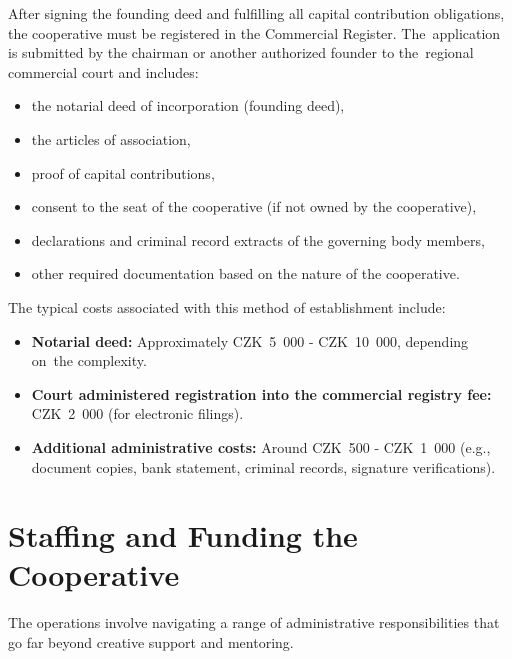 After signing the founding deed and fulfilling all capital contribution obligations, the cooperative must be registered in the Commercial Register. The~application is submitted by the chairman or another authorized founder to the~regional commercial court and includes:
\begin{itemize}
    \item the notarial deed of incorporation (founding deed),
    \item the articles of association,
    \item proof of capital contributions,
    \item consent to the seat of the cooperative (if not owned by the cooperative),
    \item declarations and criminal record extracts of the governing body members,
    \item other required documentation based on the nature of the cooperative. \cite{coop-funding}
\end{itemize}
The typical costs associated with this method of establishment include:
\begin{itemize}
    \item \textbf{Notarial deed:} Approximately CZK~5~000 - CZK~10~000, depending on~the complexity.
    \item \textbf{Court administered registration into the commercial registry fee:} CZK~2~000 (for electronic filings).
    \item \textbf{Additional administrative costs:} Around CZK~500 - CZK~1~000 (e.g., document copies, bank statement, criminal records, signature verifications). \cite{coop-funding}
\end{itemize}

\section{Staffing and Funding the Cooperative}
The operations involve navigating a range of administrative responsibilities that go far beyond creative support and mentoring.

